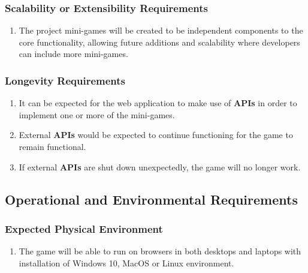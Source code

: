 \documentclass[]{article}
\begin{document}
\subsubsection{Scalability or Extensibility Requirements}
\label{ssub:scalability_or_extensibility_requirements}
\begin{enumerate}[{PR}1. ]
	\item The project mini-games will be created to be independent components to the core functionality, allowing future additions and scalability where developers can include more mini-games.
\end{enumerate}

\subsubsection{Longevity Requirements}
\label{ssub:longevity_requirements}
\begin{enumerate}[{PR}1. ]
	\item It can be expected for the web application to make use of \textbf{APIs} in order to implement one or more of the mini-games. 
	\item External \textbf{APIs} would be expected to continue functioning for the game to remain functional. 
	\item If external \textbf{APIs} are shut down unexpectedly, the game will no longer work.
\end{enumerate}


\subsection{Operational and Environmental Requirements}
\label{sub:operational_and_environmental_requirements}

\subsubsection{Expected Physical Environment}
\label{ssub:expected_physical_environment}
\begin{enumerate}[{OE}1. ]
	\item The game will be able to run on browsers in both desktops and laptops with installation of Windows 10, MacOS or Linux environment.
\end{enumerate}
\end{document}
